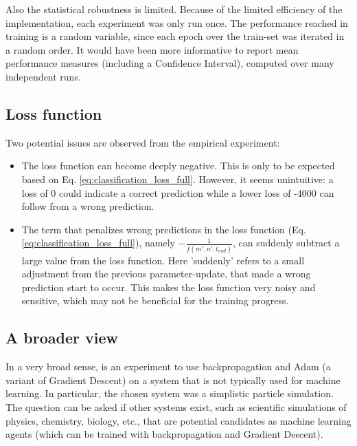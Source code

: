 Also the statistical robustness is limited. 
Because of the limited efficiency of the implementation, 
each experiment was only run once. 
The performance reached in training is a random variable, 
since each epoch over the train-set was iterated in a random order.
It would have been more informative to report mean performance measures (including a Confidence Interval), 
computed over many independent runs.

\subsection{Loss function}
Two potential issues are observed from the empirical experiment:
\begin{itemize}
	\item The loss function can become deeply negative. 
		This is only to be expected based on Eq.  \ref{eq:classification_loss_full}.
		However, it seems unintuitive: a loss of 0 could indicate a correct prediction 
		while a lower loss of -4000 can follow from a wrong prediction. 
	\item The term that penalizes wrong predictions in the loss function (Eq. \ref{eq:classification_loss_full}), 
		namely $ -\frac{1}{f(m', n', t_{end})}$, can suddenly subtract a large value from the loss function.
		Here 'suddenly' refers to a small adjustment from the previous parameter-update,
		that made a wrong prediction start to occur.
		This makes the loss function very noisy and sensitive, 
		which may not be beneficial for the training progress.
\end{itemize}

\subsection{A broader view}
In a very broad sense, \nenwin is an experiment to use backpropagation and Adam (a variant of Gradient Descent)
on a system that is not typically used for machine learning. 
In particular, the chosen system was a simplistic particle simulation. 
The question can be asked if other systems exist, 
such as scientific simulations of physics, chemistry, biology, etc., 
that are potential candidates as machine learning agents 
(which can be trained with backpropagation and Gradient Descent).